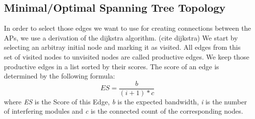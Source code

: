   \subsection{Minimal/Optimal Spanning Tree Topology}
  In order to select those edges we want to use for creating connections between the APs, we use a derivation of the dijkstra algorithm. (cite dijkstra)
  We start by selecting an arbitray initial node and marking it as visited. All edges from this set of visited nodes to unvisited nodes are called productive edges.
  We keep those productive edges in a list sorted by their scores. The score of an edge is determined by the following formula:
  \begin{equation} \label{eq:edgescore}
    ES=\frac{b}{(i + 1 )* c}
  \end{equation}
  where \textit{ES} is the Score of this Edge, \textit{b} is the expected bandwidth, \textit{i} is the number of interfering modules and \textit{c} is the connected count of the corresponding nodes.
